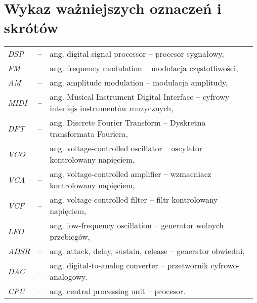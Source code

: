 \chapter*{Wykaz ważniejszych oznaczeń i skrótów}

\begin{tabular}{lcl}
	\textit{DSP} & -- & ang. digital signal processor -- procesor sygnałowy, \\
	\textit{FM} & -- & ang. frequency modulation -- modulacja częstotliwości, \\
	\textit{AM} & -- & ang. amplitude modulation -- modulacja amplitudy, \\
	\textit{MIDI} & -- & ang. Musical Instrument Digital Interface -- cyfrowy interfejs instrumentów muzycznych, \\
	\textit{DFT} & -- & ang. Discrete Fourier Transform -- Dyskretna transformata Fouriera, \\
	\textit{VCO} & -- & ang. voltage-controlled oscillator -- oscylator kontrolowany napięciem, \\
	\textit{VCA} & -- & ang. voltage-controlled amplifier -- wzmacniacz kontrolowany napięciem, \\
	\textit{VCF} & -- & ang. voltage-controlled filter -- filtr kontrolowany napięciem, \\
	\textit{LFO} & -- & ang. low-frequency oscillation -- generator wolnych przebiegów, \\
	\textit{ADSR} & -- & ang. attack, delay, sustain, release -- generator obwiedni, \\
	\textit{DAC} & -- & ang. digital-to-analog converter -- przetwornik cyfrowo-analogowy. \\
	\textit{CPU} & -- & ang. central processing unit -- procesor. \\
\end{tabular} 
